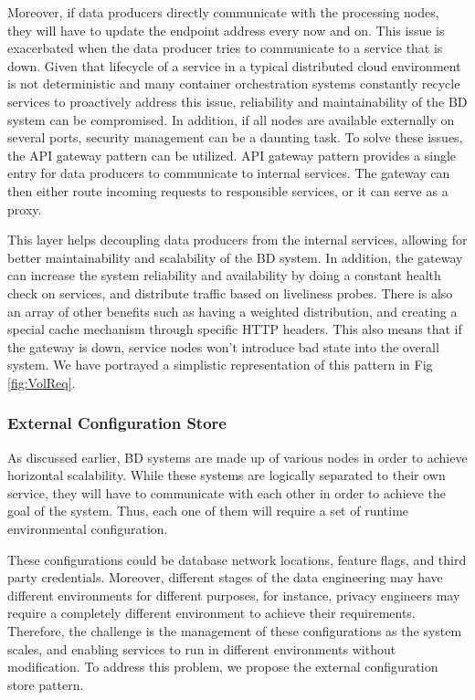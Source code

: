 \documentclass{bmcart}
\begin{document}
Moreover, if data producers directly communicate with the processing nodes, they will have to update the endpoint address every now and on. This issue is exacerbated when the data producer tries to communicate to a service that is down. Given that lifecycle of a service in a typical distributed cloud environment is not deterministic and many container orchestration systems constantly recycle services to proactively address this issue, reliability and maintainability of the BD system can be compromised. In addition, if all nodes are available externally on several ports, security management can be a daunting task. To solve these issues, the API gateway pattern can be utilized. API gateway pattern provides a single entry for data producers to communicate to internal services. The gateway can then either route incoming requests to responsible services, or it can serve as a proxy.

This layer helps decoupling data producers from the internal services, allowing for better maintainability and scalability of the BD system. In addition, the gateway can increase the system reliability and availability by doing a constant health check on services, and distribute traffic based on liveliness probes. There is also an array of other benefits such as having a weighted distribution, and creating a special cache mechanism through specific HTTP headers. This also means that if the gateway is down, service nodes won't introduce bad state into the overall system. We have portrayed a simplistic representation of this pattern in Fig \ref{fig:VolReq}. 

\subsubsection{External Configuration Store}

As discussed earlier, BD systems are made up of various nodes in order to achieve horizontal scalability. While these systems are logically separated to their own service, they will have to communicate with each other in order to achieve the goal of the system. Thus, each one of them will require a set of runtime environmental configuration. 

These configurations could be database network locations, feature flags, and third party credentials. Moreover, different stages of the data engineering may have different environments for different purposes, for instance, privacy engineers may require a completely different environment to achieve their requirements. Therefore, the challenge is the management of these configurations as the system scales, and enabling services to run in different environments without modification. To address this problem, we propose the external configuration store pattern.
\end{document}
